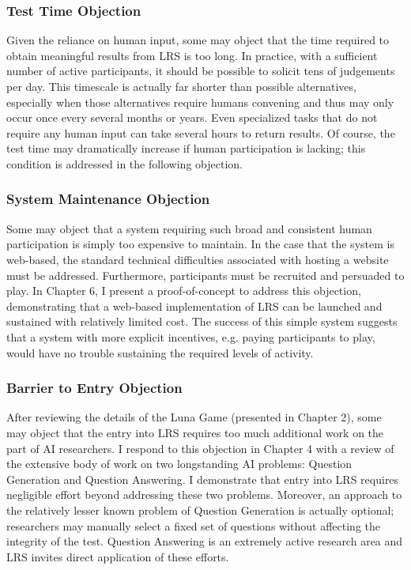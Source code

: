 \subsubsection{Test Time Objection}

Given the reliance on human input, some may object that the time required to obtain meaningful results from LRS is too long. In practice, with a sufficient number of active participants, it should be possible to solicit tens of judgements per day. This timescale is actually far shorter than possible alternatives, especially when those alternatives require humans convening and thus may only occur once every several months or years. Even specialized tasks that do not require any human input can take several hours to return results. Of course, the test time may dramatically increase if human participation is lacking; this condition is addressed in the following objection.

\subsubsection{System Maintenance Objection}

Some may object that a system requiring such broad and consistent human participation is simply too expensive to maintain. In the case that the system is web-based, the standard technical difficulties associated with hosting a website must be addressed. Furthermore, participants must be recruited and persuaded to play. In Chapter 6, I present a proof-of-concept to address this objection, demonstrating that a web-based implementation of LRS can be launched and sustained with relatively limited cost. The success of this simple system suggests that a system with more explicit incentives, e.g. paying participants to play, would have no trouble sustaining the required levels of activity.

\subsubsection{Barrier to Entry Objection}

After reviewing the details of the Luna Game (presented in Chapter 2), some may object that the entry into LRS requires too much additional work on the part of AI researchers. I respond to this objection in Chapter 4 with a review of the extensive body of work on two longstanding AI problems: Question Generation and Question Answering. I demonstrate that entry into LRS requires negligible effort beyond addressing these two problems. Moreover, an approach to the relatively lesser known problem of Question Generation is actually optional; researchers may manually select a fixed set of questions without affecting the integrity of the test. Question Answering is an extremely active research area and LRS invites direct application of these efforts.

